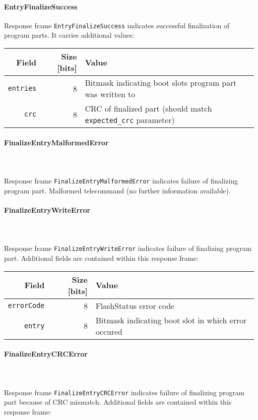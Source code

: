 \paragraph{EntryFinalizeSuccess}
Response frame \texttt{EntryFinalizeSuccess} indicates successful finalization of program parts. It carries additional values:

\begin{tabular}{r | r | l}
	Field & Size [bits] & Value \\
	\hline
	\texttt{entries} & 8 & Bitmask indicating boot slots program part was written to \\	
	\texttt{crc} & 8 & CRC of finalized part (should match \texttt{expected\_crc} parameter) \\
\end{tabular}

\paragraph{FinalizeEntryMalformedError} \mbox{} \\
 \\
Response frame \texttt{FinalizeEntryMalformedError} indicates failure of finalizing program part.
Malformed telecommand (no further information available).

\paragraph{FinalizeEntryWriteError} \mbox{} \\
 \\
Response frame \texttt{FinalizeEntryWriteError} indicates failure of finalizing program part.
Additional fields are contained within this response frame:

\begin{tabular}{r | r | l}
	Field & Size [bits] & Value \\
	\hline
	\texttt{errorCode} & 8 & FlashStatus error code \\
	\texttt{entry} & 8 & Bitmask indicating boot slot in which error occured \\	
\end{tabular}

\paragraph{FinalizeEntryCRCError} \mbox{} \\
 \\
Response frame \texttt{FinalizeEntryCRCError} indicates failure of finalizing program part because of CRC mismatch.
Additional fields are contained within this response frame:

